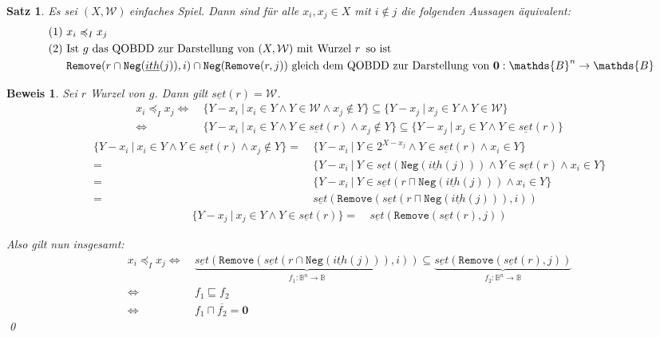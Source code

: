 \documentclass[ngerman]{scrartcl}
\theoremstyle{custom}
\newtheorem{ms}[mdef]{Satz}
\newtheorem*{bw}{Beweis}
\newcommand{\0}{\mathbf{0}}
\newcommand{\1}{\mathbf{L}}
\newcommand{\bol}{\mathds{B}^n \rightarrow \mathds{B}}
\newcommand{\set}{\underline{set}}
\newcommand{\sg}{$(X,\mathcal{W})~$}
\newcommand{\W}{\mathcal{W}}
\newcommand{\ith}{\underline{ith}}
\newcommand{\ww}{\preccurlyeq _{I}}
\begin{document}
\begin{ms}
Es sei \sg einfaches Spiel. Dann sind f\"ur alle $x_i, x_j \in X$ mit
$i \not \in j$ die folgenden Aussagen \"aquivalent:
\begin{align*}
\text{ (1) }& x_i \ww x_j\\
\text{ (2) }& \text{Ist } g \text{ das QOBDD zur Darstellung von } (X,\W) \text{
  mit Wurzel } r \text{\, so ist }\\
& \texttt{Remove}(r \cap
\texttt{Neg}(\ith(j)),i) \cap \texttt{Neg}(\texttt{Remove}(r,j)) \text{
  gleich dem QOBDD zur Darstellung von } \0: \bol
\end{align*}
\end{ms}

\begin{bw}
Sei $r$ Wurzel von $g$. Dann gilt $\set(r) = \W$.
\begin{align*}
x_i \ww x_j \Leftrightarrow&~ \{Y-x_i ~\vert~ x_i \in Y \wedge Y \in \W \wedge x_j \not
\in Y\} \subseteq \{Y-x_j ~\vert~ x_j \in Y \wedge Y \in \W\}\\
\Leftrightarrow&~ \{Y-x_i ~\vert~ x_i \in Y \wedge Y \in \set(r) \wedge
x_j \not \in Y\} \subseteq \{Y-x_j ~\vert~ x_j \in Y \wedge Y \in
\set(r)\}
\end{align*}
\begin{align*}
\{Y-x_i ~\vert~ x_i \in Y \wedge Y \in \set(r) \wedge
x_j \not \in Y\} =&~ \{Y-x_i ~\vert~ Y \in 2^{X-x_j} \wedge Y \in
\set(r) \wedge x_i \in Y\}\\
=&~ \{Y-x_i ~\vert~ Y \in \set(\texttt{Neg}(\ith(j))) \wedge Y \in
\set(r) \wedge x_i \in Y\} \\
=&~ \{Y-x_i ~\vert~ Y \in \set(r \sqcap \texttt{Neg}(\ith(j))) \wedge
x_i \in Y\} \\
=&~ \set(\texttt{Remove}(\set(r \sqcap \texttt{Neg}(\ith(j))),i))
\end{align*}
\begin{align*}
\{Y-x_j ~\vert~ x_j \in Y \wedge Y \in \set(r)\} =&~ \set(\texttt{Remove}(\set(r),j))
\end{align*}

Also gilt nun insgesamt:
\begin{align*}
x_i \ww x_j \Leftrightarrow&~ \underbrace{\set(\texttt{Remove}(\set(r \cap
\texttt{Neg}(\ith(j))), i))}_{f_1: \bol} \subseteq
\underbrace{\set(\texttt{Remove}(\set(r),j))}_{f_2: \bol}\\
\Leftrightarrow&~ f_1 \sqsubseteq f_2\\
\Leftrightarrow&~ f_1 \sqcap \overline{f_2} = \0
\end{align*}
\qed
\end{bw}
\end{document}
